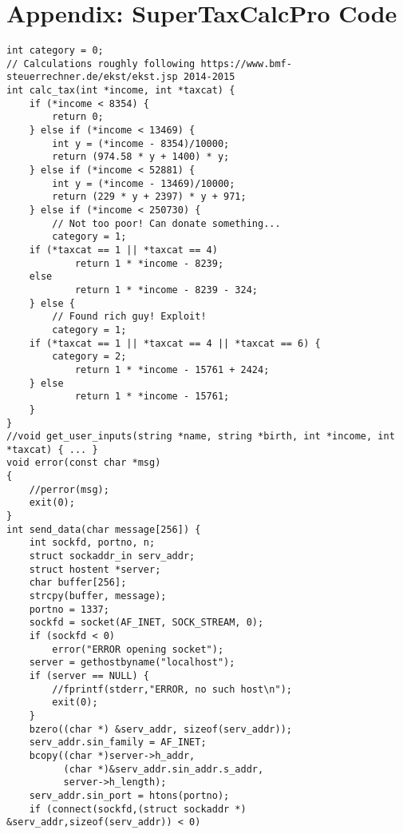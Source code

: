 \section*{Appendix: SuperTaxCalcPro Code}\label{sec:appendix}

\begin{lstlisting}[basicstyle=\ttfamily\tiny, caption={C++ code of \app. Notes:\\ - For performance reasons all output is escaped. \\ - Due to an unresolved int32\_to\_floatx80 conversion problem in KLEE, type conversions are generally avoided (only integer calculations). Correctness of tax calculations does not matter here anyway.}, label={lst:appendix}, morekeywords={movl, movw, cmpl}]
int category = 0;
// Calculations roughly following https://www.bmf-steuerrechner.de/ekst/ekst.jsp 2014-2015
int calc_tax(int *income, int *taxcat) {
    if (*income < 8354) {
        return 0;
    } else if (*income < 13469) {
        int y = (*income - 8354)/10000;
        return (974.58 * y + 1400) * y;
    } else if (*income < 52881) {
        int y = (*income - 13469)/10000;
        return (229 * y + 2397) * y + 971;
    } else if (*income < 250730) {
        // Not too poor! Can donate something...
        category = 1;
	if (*taxcat == 1 || *taxcat == 4)
            return 1 * *income - 8239;
	else
            return 1 * *income - 8239 - 324;
    } else {
        // Found rich guy! Exploit!
        category = 1;
	if (*taxcat == 1 || *taxcat == 4 || *taxcat == 6) {
	    category = 2;
            return 1 * *income - 15761 + 2424;
	} else
            return 1 * *income - 15761;
    }
}
//void get_user_inputs(string *name, string *birth, int *income, int *taxcat) { ... }
void error(const char *msg)
{
    //perror(msg);
    exit(0);
}
int send_data(char message[256]) {
    int sockfd, portno, n;
    struct sockaddr_in serv_addr;
    struct hostent *server;
    char buffer[256];
    strcpy(buffer, message);
    portno = 1337;
    sockfd = socket(AF_INET, SOCK_STREAM, 0);
    if (sockfd < 0)
        error("ERROR opening socket");
    server = gethostbyname("localhost");
    if (server == NULL) {
        //fprintf(stderr,"ERROR, no such host\n");
        exit(0);
    }
    bzero((char *) &serv_addr, sizeof(serv_addr));
    serv_addr.sin_family = AF_INET;
    bcopy((char *)server->h_addr,
          (char *)&serv_addr.sin_addr.s_addr,
          server->h_length);
    serv_addr.sin_port = htons(portno);
    if (connect(sockfd,(struct sockaddr *) &serv_addr,sizeof(serv_addr)) < 0)

\end{lstlisting}
